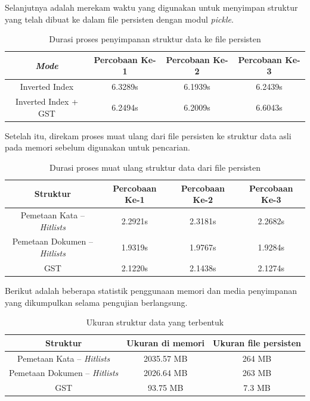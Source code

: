 Selanjutnya adalah merekam waktu yang digunakan untuk menyimpan struktur yang 
telah dibuat ke dalam file persisten dengan modul \textit{pickle}.

\begin{table}[H]
\begin{center}
  \caption{\label{tabel:durasi_store} Durasi proses penyimpanan struktur data 
  ke file persisten}
\begin{tabular}{|c|c|c|c|} 
 \hline
  \textit{Mode} & Percobaan Ke-1 & Percobaan Ke-2 & Percobaan Ke-3 \\ 
 \hline
  Inverted Index & 6.3289s & 6.1939s & 6.2439s \\ 
  Inverted Index + GST & 6.2494s & 6.2009s & 6.6043s \\
 \hline
\end{tabular}
\end{center}
\end{table}

Setelah itu, direkam proses muat ulang dari file persisten ke struktur data asli
pada memori sebelum digunakan untuk pencarian.

\begin{table}[H]
\begin{center}
  \caption{\label{tabel:durasi_restore} Durasi proses muat ulang struktur data 
  dari file persisten}
\begin{tabular}{|c|c|c|c|} 
 \hline
  Struktur & Percobaan Ke-1 & Percobaan Ke-2 & Percobaan Ke-3 \\ 
 \hline
  Pemetaan Kata -- \textit{Hitlists} & 2.2921s & 2.3181s & 2.2682s \\
  Pemetaan Dokumen -- \textit{Hitlists} & 1.9319s & 1.9767s & 1.9284s \\ 
  GST & 2.1220s & 2.1438s & 2.1274s \\
 \hline
\end{tabular}
\end{center}
\end{table}

Berikut adalah beberapa statistik penggunaan memori dan media penyimpanan yang
dikumpulkan selama pengujian berlangsung.

\begin{table}[H]
\begin{center}
  \caption{\label{tabel:ukuran_struktur} Ukuran struktur data yang terbentuk}
\begin{tabular}{|c|c|c|} 
 \hline
  Struktur & Ukuran di memori & Ukuran file persisten \\ 
 \hline
  Pemetaan Kata -- \textit{Hitlists} & 2035.57 MB & 264 MB \\ 
  Pemetaan Dokumen -- \textit{Hitlists} & 2026.64 MB & 263 MB \\
  GST & 93.75 MB & 7.3 MB \\
 \hline
\end{tabular}
\end{center}
\end{table}

